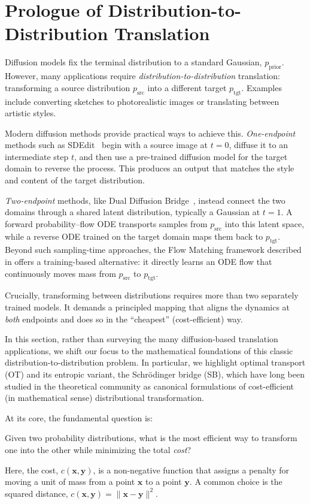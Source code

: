 \newpage
\section{Prologue of Distribution-to-Distribution Translation} 
Diffusion models fix the terminal distribution to a standard Gaussian, $p_{\mathrm{prior}}$.  
However, many applications require \emph{distribution-to-distribution} translation: transforming a source distribution $p_{\mathrm{src}}$ into a different target $p_{\mathrm{tgt}}$.  
Examples include converting sketches to photorealistic images or translating between artistic styles.

Modern diffusion methods provide practical ways to achieve this.  
\emph{One-endpoint} methods such as SDEdit~\citep{meng2021sdedit} begin with a source image at $t=0$, diffuse it to an intermediate step $t$, and then use a pre-trained diffusion model for the target domain to reverse the process.  
This produces an output that matches the style and content of the target distribution.  

\emph{Two-endpoint} methods, like Dual Diffusion Bridge~\citep{su2022dual}, instead connect the two domains through a shared latent distribution, typically a Gaussian at $t=1$.  
A forward probability–flow ODE transports samples from $p_{\mathrm{src}}$ into this latent space, while a reverse ODE trained on the target domain maps them back to $p_{\mathrm{tgt}}$.  
Beyond such sampling-time approaches, the Flow Matching framework described in  offers a training-based alternative: it directly learns an ODE flow that continuously moves mass from $p_{\mathrm{src}}$ to $p_{\mathrm{tgt}}$.  

Crucially, transforming between distributions requires more than two separately trained models. 
It demands a principled mapping that aligns the dynamics at \emph{both} endpoints and does so in the ``cheapest'' (cost-efficient) way. 

In this section, rather than surveying the many diffusion-based translation applications, we shift our focus to the mathematical foundations of this classic distribution-to-distribution problem.  
In particular, we highlight optimal transport (OT) and its entropic variant, the Schrödinger bridge (SB), which have long been studied in the theoretical community as canonical formulations of cost-efficient (in mathematical sense) distributional transformation.



At its core,  the fundamental question is: 
\begin{question}
    Given two probability distributions, what is the most efficient way to transform one into the other while minimizing the total \emph{cost}?
\end{question}
Here, the cost, $ c(\mathbf{x}, \mathbf{y}) $, is a non-negative function that assigns a penalty for moving a unit of mass from a point $ \mathbf{x}  $ to a point $ \mathbf{y}$. A common choice is the squared distance, $c(\mathbf{x}, \mathbf{y}) = \|\mathbf{x} - \mathbf{y}\|^2$.

